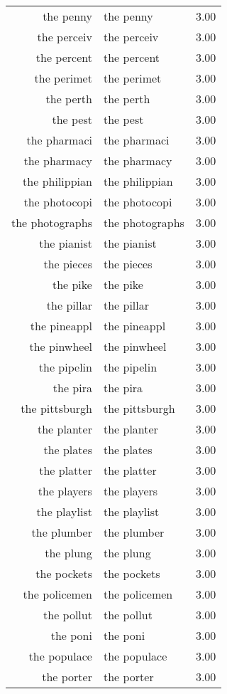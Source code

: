\begin{table}[ht]
\begin{tabular}{rlr}
  the penny & the penny & 3.00 \\ 
  the perceiv & the perceiv & 3.00 \\ 
  the percent & the percent & 3.00 \\ 
  the perimet & the perimet & 3.00 \\ 
  the perth & the perth & 3.00 \\ 
  the pest & the pest & 3.00 \\ 
  the pharmaci & the pharmaci & 3.00 \\ 
  the pharmacy & the pharmacy & 3.00 \\ 
  the philippian & the philippian & 3.00 \\ 
  the photocopi & the photocopi & 3.00 \\ 
  the photographs & the photographs & 3.00 \\ 
  the pianist & the pianist & 3.00 \\ 
  the pieces & the pieces & 3.00 \\ 
  the pike & the pike & 3.00 \\ 
  the pillar & the pillar & 3.00 \\ 
  the pineappl & the pineappl & 3.00 \\ 
  the pinwheel & the pinwheel & 3.00 \\ 
  the pipelin & the pipelin & 3.00 \\ 
  the pira & the pira & 3.00 \\ 
  the pittsburgh & the pittsburgh & 3.00 \\ 
  the planter & the planter & 3.00 \\ 
  the plates & the plates & 3.00 \\ 
  the platter & the platter & 3.00 \\ 
  the players & the players & 3.00 \\ 
  the playlist & the playlist & 3.00 \\ 
  the plumber & the plumber & 3.00 \\ 
  the plung & the plung & 3.00 \\ 
  the pockets & the pockets & 3.00 \\ 
  the policemen & the policemen & 3.00 \\ 
  the pollut & the pollut & 3.00 \\ 
  the poni & the poni & 3.00 \\ 
  the populace & the populace & 3.00 \\ 
  the porter & the porter & 3.00 \\ 

\end{tabular}
\end{table}

